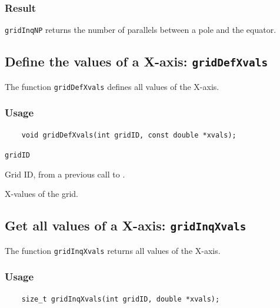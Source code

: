 \subsubsection*{Result}

{\texttt{gridInqNP}} returns the number of parallels between a pole and the equator.



\subsection{Define the values of a X-axis: \texttt{gridDefXvals}}
\label{gridDefXvals}

The function {\texttt{gridDefXvals}} defines all values of the X-axis.

\subsubsection*{Usage}

\begin{verbatim}
    void gridDefXvals(int gridID, const double *xvals);
\end{verbatim}

\hspace*{4mm}\begin{minipage}[]{15cm}
\begin{deflist}{\texttt{gridID}\ }
\item[\texttt{gridID}]
Grid ID, from a previous call to {}.
\item[\texttt{xvals}]
X-values of the grid.

\end{deflist}
\end{minipage}


\subsection{Get all values of a X-axis: \texttt{gridInqXvals}}
\label{gridInqXvals}

The function {\texttt{gridInqXvals}} returns all values of the X-axis.

\subsubsection*{Usage}

\begin{verbatim}
    size_t gridInqXvals(int gridID, double *xvals);
\end{verbatim}

